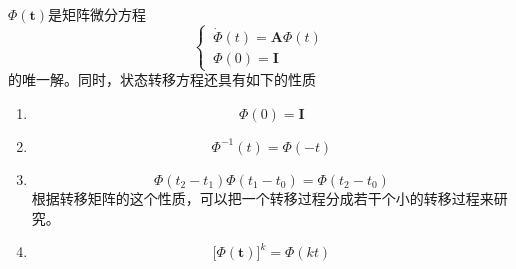 \theorem[状态转移矩阵的性质]
$\bm{\varPhi(t)}$是矩阵微分方程
\begin{equation}
	\begin{cases}
		\, \dot{\bm{\varPhi}}(t) = \bm{A}\bm{\varPhi}(t)\\
		\, \bm{\varPhi}(0) = \bm{I}
	\end{cases}
\end{equation}
的唯一解。同时，状态转移方程还具有如下的性质
\begin{enumerate}
	\item 
	\begin{equation}
		\bm{\varPhi}(0) = \bm{I}
	\end{equation}
	\item 
	\begin{equation}
		\bm{\varPhi}^{-1}(t) = \bm{\varPhi}(-t)
	\end{equation}

	\item 
	\begin{equation}
		\bm{\varPhi}(t_2 - t_1)\bm{\varPhi}(t_1 - t_0) = \bm{\varPhi}(t_2 - t_0)
	\end{equation}
	根据转移矩阵的这个性质，可以把一个转移过程分成若干个小的转移过程来研究。
	
	\item 
	\begin{equation}
		\big[\bm{\varPhi(t)}\big]^k = \bm{\varPhi}(kt)
	\end{equation}
\end{enumerate}
\vspace*{0.5em}

